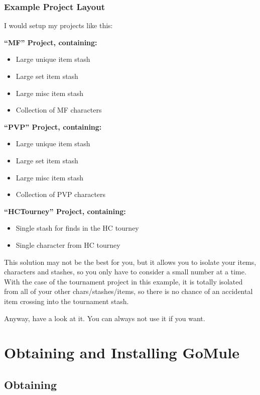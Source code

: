 \documentclass[a4paper,10pt]{article}
\begin{document}
\subsubsection{Example Project Layout}

I would setup my projects like this:\newline


\textbf{``MF'' Project, containing:}
\begin{itemize}
 \item Large unique item stash
\item Large set item stash
\item Large misc item stash
\item Collection of MF characters
\end{itemize}

\textbf{``PVP'' Project, containing:}
\begin{itemize}
 \item Large unique item stash
\item Large set item stash
\item Large misc item stash
 \item Collection of PVP characters
\end{itemize}

\textbf{``HCTourney'' Project, containing: }
\begin{itemize}
 \item Single stash for finds in the HC tourney
\item Single character from HC tourney
\end{itemize}

This solution may not be the best for you, but it allows you to isolate your items, characters and stashes, so you only have to consider a small number at a time. With the case of the tournament project in this example, it is totally isolated from all of your other chars/stashes/items, so there is no chance of an accidental item crossing into the tournament stash. 

Anyway, have a look at it. You can always not use it if you want.


\section{Obtaining and Installing GoMule}

\subsection{Obtaining}
\end{document}
